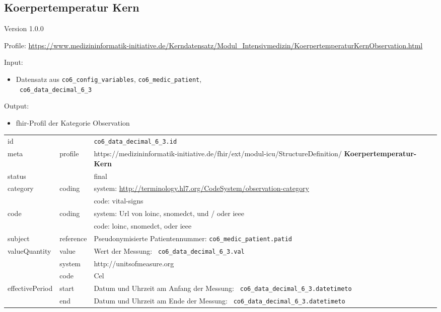 \subsection{Koerpertemperatur Kern} 
\noindent Version 1.0.0

\noindent Profile: \url{https://www.medizininformatik-initiative.de/Kerndatensatz/Modul_Intensivmedizin/KoerpertemperaturKernObservation.html}

\noindent Input:
\begin{itemize}
	\item Datensatz aus \texttt{co6\_config\_variables}, \texttt{co6\_medic\_patient}, \\ \texttt{
co6\_data\_decimal\_6\_3}
\end{itemize}
Output:
\begin{itemize}
        \item \ac{fhir}-Profil der Kategorie \glqq Observation\grqq{}
\end{itemize}
\begin{longtable}{|l|l|p{7.5cm}|}
        \hline
        \rowcolor{lightgray} \multicolumn{3}{|l|}{Data Mapping (inhaltlich)} \\ \hline
        id &  & \texttt{co6\_data\_decimal\_6\_3.id} \\ \hline
	meta & profile & https://medizininformatik-initiative.de/fhir/ext/modul-icu/StructureDefinition/\textbf{
Koerpertemperatur-Kern} \\ \hline 
	status &  & final  \\ \hline 
	category & coding & system: \url{http://terminology.hl7.org/CodeSystem/observation-category} \\
\cline{3-3}
	& & code: vital-signs \\ \hline
	code & coding & system: Url von \ac{loinc}, \ac{snomedct}, und / oder \ac{ieee} \\ 
	\cline{3-3} 
	 &  & code: \ac{loinc}, \ac{snomedct}, oder \ac{ieee} \\ \hline
	subject & reference & Pseudonymisierte Patientennummer: \texttt{co6\_medic\_patient.patid} \\ \hline
	valueQuantity & value & Wert der Messung: \texttt{
co6\_data\_decimal\_6\_3.val} \\
        \cline{2-3}
         & system & http://unitsofmeasure.org \\
         \cline{2-3}
         & code & Cel \\ \hline
    effectivePeriod & start & Datum und Uhrzeit am Anfang der Messung: \texttt{
co6\_data\_decimal\_6\_3.datetimeto} \\
    \cline{2-3}
     & end & Datum und Uhrzeit am Ende der Messung: \texttt{
co6\_data\_decimal\_6\_3.datetimeto} \\ \hline
\end{longtable}



